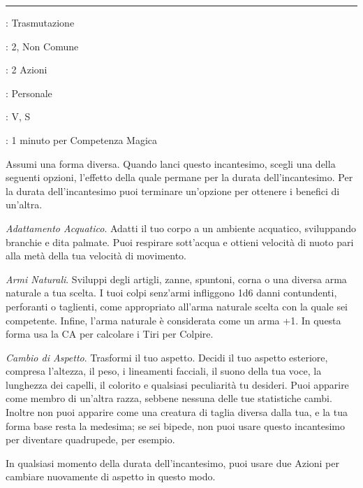 \begin{multicols}{2}
\smallskip\noindent\rule{\linewidth}{2pt} \hypertarget{Alterare Sé Stesso}{}\medskip{}\label{Alter Self}
\noindent
\begin{description}[noitemsep, topsep=0pt, parsep=0pt, partopsep=0pt, leftmargin=0cm, labelwidth=2.8cm]
\item[\textbf{Lista di Magia}]: Trasmutazione
\item[\textbf{Livello}]: 2, Non Comune
\item[\textbf{T. di Lancio}]: 2 Azioni
\item[\textbf{Gittata}]: Personale
\item[\textbf{Componenti}]: V, S
\item[\textbf{Durata}]: 1 minuto per Competenza Magica
\end{description}

Assumi una forma diversa. Quando lanci questo incantesimo, scegli una della seguenti opzioni, l'effetto della quale permane per la durata dell'incantesimo. Per la durata dell'incantesimo puoi terminare un'opzione per ottenere i benefici di un'altra.

\emph{Adattamento Acquatico}. Adatti il tuo corpo a un ambiente acquatico, sviluppando branchie e dita palmate. Puoi respirare sott'acqua e ottieni velocità di nuoto pari alla metà della tua velocità di movimento.

\emph{Armi Naturali}. Sviluppi degli artigli, zanne, spuntoni, corna o una diversa arma naturale a tua scelta. I tuoi colpi senz'armi infliggono 1d6 danni contundenti, perforanti o taglienti, come appropriato all'arma naturale scelta con la quale sei competente. Infine, l'arma naturale è considerata come un arma +1. In questa forma usa la CA per calcolare i Tiri per Colpire.

\emph{Cambio di Aspetto}. Trasformi il tuo aspetto. Decidi il tuo aspetto esteriore, compresa l'altezza, il peso, i lineamenti facciali, il suono della tua voce, la lunghezza dei capelli, il colorito e qualsiasi peculiarità tu desideri. Puoi apparire come membro di un'altra razza, sebbene nessuna delle tue statistiche cambi. Inoltre non puoi apparire come una creatura di taglia diversa dalla tua, e la tua forma base resta la medesima; se sei bipede, non puoi usare questo incantesimo per diventare quadrupede, per esempio.

In qualsiasi momento della durata dell'incantesimo, puoi usare due Azioni per cambiare nuovamente di aspetto in questo modo.


\end{multicols}
